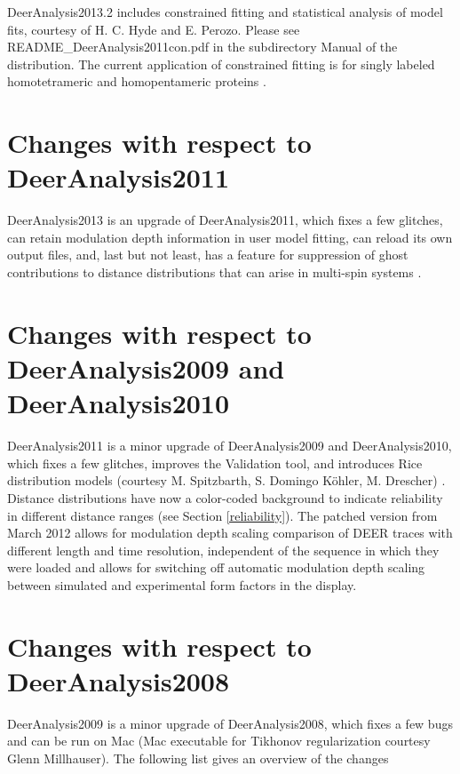 \documentclass{article}
\begin{document}
DeerAnalysis2013.2 includes constrained fitting and statistical analysis of model fits, courtesy of H. C. Hyde and E. Perozo. Please see {\ttfamily README\_DeerAnalysis2011con.pdf} in the subdirectory {\ttfamily Manual} of the distribution. The current application of constrained fitting is for singly labeled homotetrameric and homopentameric proteins \cite{dalmas2012}.

\section{Changes with respect to DeerAnalysis2011}
\label{changes_2013}

DeerAnalysis2013 is an upgrade of DeerAnalysis2011, which fixes a few glitches, can retain modulation depth information in user model fitting, can reload its own output files, and, last but not least, has a feature for suppression of ghost contributions to distance distributions that can arise in multi-spin systems \cite{vonHagens2013}.    

\section{Changes with respect to DeerAnalysis2009 and DeerAnalysis2010}
\label{changes_2010_1}

DeerAnalysis2011 is a minor upgrade of DeerAnalysis2009 and DeerAnalysis2010, which fixes a few glitches, improves the {\ttfamily Validation} tool, and introduces Rice distribution models (courtesy M. Spitzbarth, S. Domingo K\"ohler, M. Drescher) \cite{koehler2011}. Distance distributions have now a color-coded background to indicate reliability in different distance ranges (see Section \ref{reliability}). The patched version from March 2012 allows for modulation depth scaling comparison of DEER traces with different length and time resolution, independent of the sequence in which they were loaded and allows for switching off automatic modulation depth scaling between simulated and experimental form factors in the display.    

\section{Changes with respect to DeerAnalysis2008}
\label{changes_2008_1}

DeerAnalysis2009 is a minor upgrade of DeerAnalysis2008, which fixes a few bugs and can be run on Mac (Mac executable for Tikhonov regularization courtesy Glenn Millhauser). The following list gives an overview of the changes    
\end{document}
